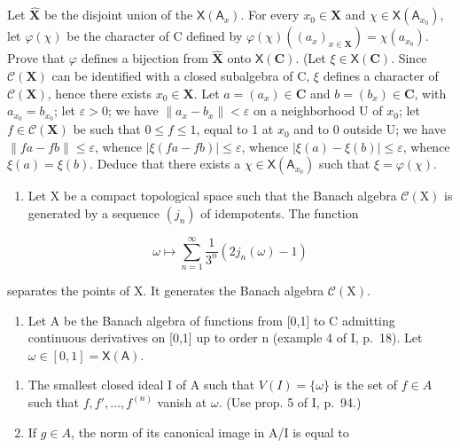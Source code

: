 Let \(\widehat{\mathbf{X}}\) be the disjoint union of the \(\mathsf{X}(\mathsf{A}_x)\). For every \(x_0 \in \mathbf{X}\) and \(\chi \in \mathsf{X}(\mathsf{A}_{x_0})\), let \(\varphi(\chi)\) be the character of C defined by \(\varphi(\chi)((a_x)_{x \in \mathbf{X}}) = \chi(a_{x_0})\). Prove that \(\varphi\) defines a bijection from \(\widehat{\mathbf{X}}\) onto \(\mathsf{X}(\mathbf{C})\). (Let \(\xi \in \mathsf{X}(\mathbf{C})\). Since \(\mathcal{C}(\mathbf{X})\) can be identified with a closed subalgebra of C, \(\xi\) defines a character of \(\mathcal{C}(\mathbf{X})\), hence there exists \(x_0 \in \mathbf{X}\). Let \(a = (a_x) \in \mathbf{C}\) and \(b = (b_x) \in \mathbf{C}\), with \(a_{x_0} = b_{x_0}\); let \(\varepsilon > 0\); we have \(\|a_x - b_x\| < \varepsilon\) on a neighborhood U of \(x_0\); let \(f \in \mathcal{C}(\mathbf{X})\) be such that \(0 \leqslant f \leqslant 1\), equal to 1 at \(x_0\) and to 0 outside U; we have \(\|fa - fb\| \leqslant \varepsilon\), whence \(|\xi(fa - fb)| \leqslant \varepsilon\), whence \(|\xi(a) - \xi(b)| \leqslant \varepsilon\), whence \(\xi(a) = \xi(b)\). Deduce that there exists a \(\chi \in \mathsf{X}(\mathsf{A}_{x_0})\) such that \(\xi = \varphi(\chi)\).

\begin{enumerate}
\def\labelenumi{\arabic{enumi})}
\setcounter{enumi}{3}
\tightlist
\item
  Let X be a compact topological space such that the Banach algebra \(\mathcal{C}(\mathrm{X})\) is generated by a sequence \((j_n)\) of idempotents. The function
\end{enumerate}

\[
\omega \mapsto \sum_ {n = 1} ^ {\infty} \frac {1}{3 ^ {n}} (2 j _ {n} (\omega) - 1)
\]

separates the points of X. It generates the Banach algebra \(\mathcal{C}(\mathrm{X})\).

\begin{enumerate}
\def\labelenumi{\arabic{enumi})}
\setcounter{enumi}{4}
\tightlist
\item
  Let A be the Banach algebra of functions from {[}0,1{]} to C admitting continuous derivatives on {[}0,1{]} up to order n (example 4 of I, p.~18). Let \(\omega \in [0,1] = \mathsf{X}(\mathsf{A})\).
\end{enumerate}

\begin{enumerate}
\def\labelenumi{\alph{enumi})}
\item
  The smallest closed ideal I of A such that \(V(I) = \{\omega\}\) is the set of \(f \in A\) such that \(f, f', \ldots, f^{(n)}\) vanish at \(\omega\). (Use prop. 5 of I, p.~94.)
\item
  If \(g \in A\), the norm of its canonical image in A/I is equal to
\end{enumerate}


